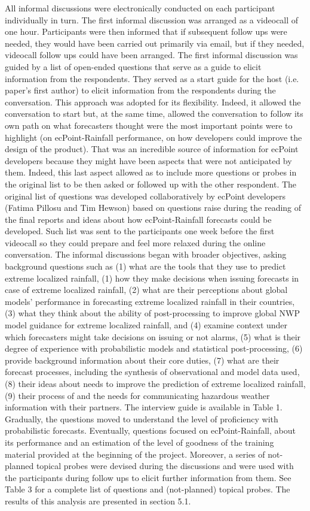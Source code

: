 \documentclass[twocol]{ametsocV5} %
\begin{document}
All informal discussions were electronically conducted on each participant individually in turn. The first informal discussion was arranged as a videocall of one hour. Participants were then informed that if subsequent follow ups were needed, they would have been carried out primarily via email, but if they needed, videocall follow ups could have been arranged. 
The first informal discussion was guided by a list of open-ended questions that serve as a guide to elicit information from the respondents. They served as a start guide for the host (i.e. paper’s first author) to elicit information from the respondents during the conversation. This approach was adopted for its flexibility. Indeed, it allowed the conversation to start but, at the same time, allowed the conversation to follow its own path on what forecasters thought were the most important points were to highlight (on ecPoint-Rainfall performance, on how developers could improve the design of the product). That was an incredible source of information for ecPoint developers because they might have been aspects that were not anticipated by them. Indeed, this last aspect allowed as to include more questions or probes in the original list to be then asked or followed up with the other respondent. The original list of questions was developed collaboratively by ecPoint developers (Fatima Pillosu and Tim Hewson) based on questions raise during the reading of the final reports and ideas about how ecPoint-Rainfall forecasts could be developed. Such list was sent to the participants one week before the first videocall so they could prepare and feel more relaxed during the online conversation. The informal discussions began with broader objectives, asking background questions such as (1) what are the tools that they use to predict extreme localized rainfall, (1) how they make decisions when issuing forecasts in case of extreme localized rainfall, (2) what are their perceptions about global models’ performance in forecasting extreme localized rainfall in their countries, (3) what they think about the ability of post-processing to improve global NWP model guidance for extreme localized rainfall, and (4) examine context under which forecasters might take decisions on issuing or not alarms, (5) what is their degree of experience with probabilistic models and statistical post-processing, (6) provide background information about their core duties, (7) what are their forecast processes, including the synthesis of observational and model data used, (8) their ideas about needs to improve the prediction of extreme localized rainfall, (9) their process of  and the needs for communicating hazardous weather information with their partners. The interview guide is available in Table 1. Gradually, the questions moved to understand the level of proficiency with probabilistic forecasts. Eventually, questions focused on ecPoint-Rainfall, about its performance and an estimation of the level of goodness of the training material provided at the beginning of the project. Moreover, a series of not-planned topical probes were devised during the discussions and were used with the participants during follow ups to elicit further information from them. See Table 3 for a complete list of questions and (not-planned) topical probes. The results of this analysis are presented in section 5.1.
\end{document}
